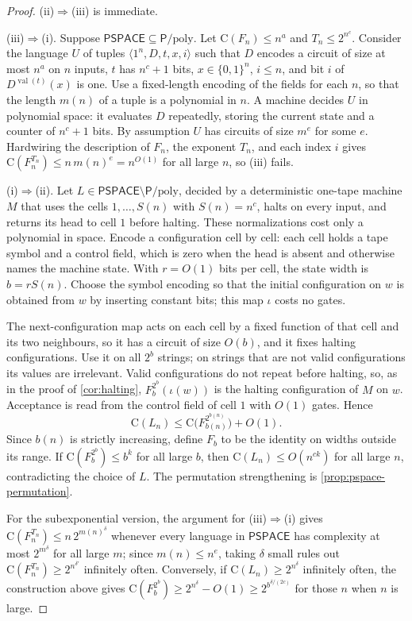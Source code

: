 \documentclass[11pt]{article}
\theoremstyle{definition}
\theoremstyle{remark}
\newcommand{\bits}{\{0,1\}}
\newcommand{\CC}{\mathrm{C}}
\numberwithin{equation}{section}
\begin{document}
\begin{proof}
(ii)$\Rightarrow$(iii) is immediate.

(iii)$\Rightarrow$(i).  Suppose $\mathsf{PSPACE}\subseteq\mathsf{P}/\mathrm{poly}$.
Let $\CC(F_n)\leq n^a$ and $T_n\leq 2^{n^c}$.  Consider the language $U$
of tuples $\langle 1^n,D,t,x,i\rangle$ such that $D$ encodes a circuit of
size at most $n^a$ on $n$ inputs, $t$ has $n^c+1$ bits, $x\in\bits^n$,
$i\leq n$, and bit $i$ of $D^{\operatorname{val}(t)}(x)$ is one.  Use a
fixed-length encoding of the fields for each $n$, so that the length
$m(n)$ of a tuple is a polynomial in $n$.  A machine decides $U$ in
polynomial space: it evaluates $D$ repeatedly, storing the current state
and a counter of $n^c+1$ bits.  By assumption $U$ has circuits of size
$m^e$ for some $e$.  Hardwiring the description of $F_n$, the exponent
$T_n$, and each index $i$ gives $\CC(F_n^{T_n})\leq n\,m(n)^e=n^{O(1)}$
for all large $n$, so (iii) fails.

(i)$\Rightarrow$(ii).  Let $L\in\mathsf{PSPACE}\setminus\mathsf{P}/\mathrm{poly}$,
decided by a deterministic one-tape machine $M$ that uses the cells
$1,\ldots,S(n)$ with $S(n)=n^c$, halts on every input, and returns its
head to cell $1$ before halting.  These normalizations cost only a
polynomial in space.  Encode a configuration cell by cell: each cell
holds a tape symbol and a control field, which is zero when the head is
absent and otherwise names the machine state.  With $r=O(1)$ bits per
cell, the state width is $b=rS(n)$.  Choose the symbol encoding so that
the initial configuration on $w$ is obtained from $w$ by inserting
constant bits; this map $\iota$ costs no gates.

The next-configuration map acts on each cell by a fixed function of that
cell and its two neighbours, so it has a circuit of size $O(b)$, and it
fixes halting configurations.  Use it on all $2^b$ strings; on strings
that are not valid configurations its values are irrelevant.  Valid
configurations do not repeat before halting, so, as in the proof of
\cref{cor:halting}, $F_b^{2^b}(\iota(w))$ is the halting configuration
of $M$ on $w$.  Acceptance is read from the control field of cell $1$
with $O(1)$ gates.  Hence
\[
 \CC(L_n)\leq\CC\bigl(F_{b(n)}^{2^{b(n)}}\bigr)+O(1).
\]
Since $b(n)$ is strictly increasing, define $F_b$ to be the identity on
widths outside its range.  If $\CC(F_b^{2^b})\leq b^k$ for all large $b$,
then $\CC(L_n)\leq O(n^{ck})$ for all large $n$, contradicting the choice
of $L$.  The permutation strengthening is \cref{prop:pspace-permutation}.

For the subexponential version, the argument for (iii)$\Rightarrow$(i)
gives $\CC(F_n^{T_n})\leq n\,2^{m(n)^\delta}$ whenever every language in
$\mathsf{PSPACE}$ has complexity at most $2^{m^\delta}$ for all large $m$;
since $m(n)\leq n^e$, taking $\delta$ small rules out
$\CC(F_n^{T_n})\geq 2^{n^{\delta'}}$ infinitely often.  Conversely, if
$\CC(L_n)\geq 2^{n^\delta}$ infinitely often, the construction above gives
$\CC(F_b^{2^b})\geq 2^{n^\delta}-O(1)\geq 2^{b^{\delta/(2c)}}$ for those
$n$ when $n$ is large.
\end{proof}
\end{document}
